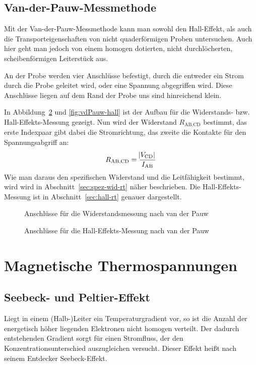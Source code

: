 \subsection{Van-der-Pauw-Messmethode}

Mit der Van-der-Pauw-Messmethode kann man sowohl den Hall-Effekt, als auch die
Transporteigenschaften von nicht quaderförmigen Proben untersuchen. Auch hier
geht man jedoch von einem homogen dotierten, nicht durchlöcherten,
scheibenförmigen Leiterstück aus.

An der Probe werden vier Anschlüsse befestigt, durch die entweder ein Strom
durch die Probe geleitet wird, oder eine Spannung abgegriffen wird. Diese
Anschlüsse liegen auf dem Rand der Probe uns sind hinreichend klein.

In Abbildung~\ref{fig:vdPauw-wid} und \ref{fig:vdPauw-hall} ist der Aufbau für
die Widerstands- bzw. Hall-Effekts-Messung gezeigt. Nun wird der Widerstand
$R_\text{AB,CD}$ bestimmt, das erste Indexpaar gibt dabei die Stromrichtung,
das zweite die Kontakte für den Spannungsabgriff an:
\[
    R_\text{AB,CD} = \frac{\abs{V_\text{CD}}}{I_\text{AB}}
\]
Wie man daraus den spezifischen Widerstand und die Leitfähigkeit bestimmt, wird
wird in Abschnitt~\ref{sec:spez-wid-rt} näher beschrieben. Die
Hall-Effekts-Messung ist in Abschnitt~\ref{sec:hall-rt} genauer dargestellt.

\begin{figure}
    \centering
    \caption{%
        Anschlüsse für die Widerstandsmessung nach van der Pauw
    }
    \label{fig:vdPauw-wid}
\end{figure}

\begin{figure}
    \centering
    \caption{%
        Anschlüsse für die Hall-Effekts-Messung nach van der Pauw
    }
    \label{fig:vdPauw-wid}
\end{figure}

\section{Magnetische Thermospannungen}

\subsection{Seebeck- und Peltier-Effekt}

Liegt in einem (Halb-)Leiter ein Temperaturgradient vor, so ist die Anzahl der
energetisch höher liegenden Elektronen nicht homogen verteilt. Der dadurch
entstehenden Gradient sorgt für einen Stromfluss, der den
Konzentrationsunterschied auszugleichen versucht. Dieser Effekt heißt nach
seinem Entdecker Seebeck-Effekt.

